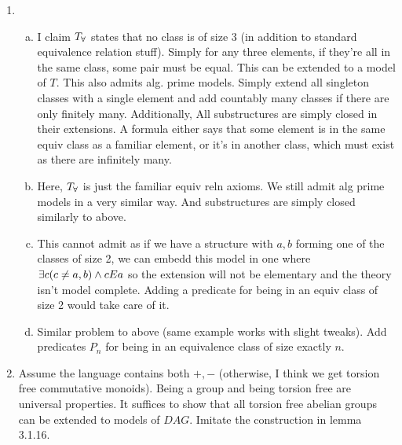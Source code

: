 
\begin{enumerate}[1.]
\item
 
  \begin{enumerate}[a)] 
    \item I claim \(T_\forall\) states that no class is of size 3 (in addition to standard equivalence relation stuff). Simply for any three elements, if they're all in the same class, some pair must be equal. This can be extended to a model of \(T\). This also admits alg. prime models. Simply extend all singleton classes with a single element and add countably many classes if there are only finitely many. Additionally, All substructures are simply closed in their extensions. A \qf formula either says that some element is in the same equiv class as a familiar element, or it's in another class, which must exist as there are infinitely many. 

    \item Here, \(T_\forall\) is just the familiar equiv reln axioms. We still admit alg prime models in a very similar way. And substructures are simply closed similarly to above. 

    \item This cannot admit \qe as if we have a structure with \(a, b\) forming one of the classes of size 2, we can embedd this model in one where \(\exists c (c \neq a, b) \land c E a\) so the extension will not be elementary and the theory isn't model complete. Adding a predicate for being in an equiv class of size 2 would take care of it. 

    \item Similar problem to above (same example works with slight tweaks). Add predicates \(P_n\) for being in an equivalence class of size exactly \(n\). 

 
  \end{enumerate}

\item Assume the language contains both \(+, -\) (otherwise, I think we get torsion free commutative monoids). Being a group and being torsion free are universal properties. It suffices to show that all torsion free abelian groups can be extended to models of \(DAG\). Imitate the construction in lemma 3.1.16.  	


\end{enumerate}

